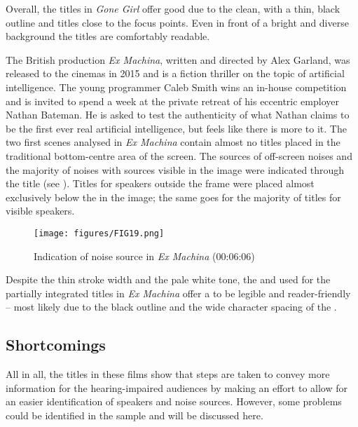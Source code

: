 Overall, the titles in \textit{Gone Girl} offer good  due to the clean,   with a thin, black outline and titles close to the focus points. Even in front of a bright and diverse background the titles are comfortably readable.

The British production \textit{Ex Machina}, written and directed by Alex Garland, was released to the cinemas in 2015 and is a fiction thriller on the topic of artificial intelligence. The young programmer Caleb Smith wins an in-house competition and is invited to spend a week at the private retreat of his eccentric employer Nathan Bateman. He is asked to test the authenticity of what Nathan claims to be the first ever real artificial intelligence, but feels like there is more to it. The two first scenes analysed in \textit{Ex Machina} contain almost no titles placed in the traditional bottom-centre area of the screen. The sources of off-screen noises and the majority of noises with sources visible in the image were indicated through the title  (see ). Titles for speakers outside the frame were placed almost exclusively below the  in the image; the same goes for the majority of titles for visible speakers.

\begin{figure}
\texttt{[image: figures/FIG19.png]}
\caption{Indication of noise source in \textit{Ex Machina} (00:06:06)}
\label{fig:FIG19}
\end{figure}

Despite the thin stroke width and the pale white tone, the  and  used for the partially integrated titles in \textit{Ex Machina} offer a  to be legible and reader-friendly – most likely due to the black outline and the wide character spacing of the  .

\subsection{Shortcomings}\label{sec:4.1.2}

All in all, the titles in these films show that steps are taken to convey more information for the hearing-impaired audiences by making an effort to allow for an easier identification of speakers and noise sources. However, some problems could be identified in the sample and will be discussed here.


